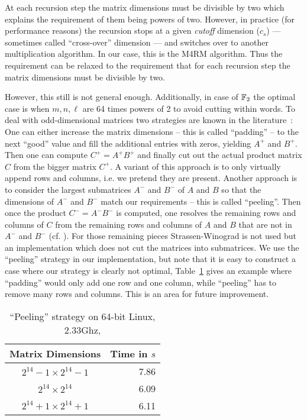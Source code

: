 At each recursion step the matrix dimensions must be divisible by two which explains the requirement of them being powers of two. However, in practice (for performance reasons) the recursion stops at a given \emph{cutoff} dimension ($c_s$) --- sometimes called ``cross-over'' dimension --- and switches over to another multiplication algorithm. In our case, this is the M4RM algorithm. Thus the requirement can be relaxed to the requirement that for each recursion step the matrix dimensions must be divisible by two.

However, this still is not general enough. Additionally, in case of $\mathbb{F}_2$ the optimal case is when $m,n,\ell$ are  64 times powers of 2 to avoid cutting within words. To deal with odd-dimensional matrices two strategies are known in the literature~\cite{strassen-implementation}: One can either increase the matrix dimensions -- this is called ``padding'' -- to the next ``good'' value and fill the additional entries with zeros, yielding $A^+$ and $B^+$. Then one can compute $C^+ = A^+B^+$ and finally cut out the actual product matrix $C$ from the bigger matrix $C^+$. A variant of this approach is to only virtually append rows and columns, i.e. we pretend they are present. Another approach is to consider the largest submatrices $A^-$ and $B^-$ of $A$ and $B$ so that the dimensions of $A^-$ and $B^-$ match our requirements -- this is called ``peeling''. Then once the product $C^- = A^-B^-$ is computed, one resolves the remaining rows and columns of $C$ from the remaining rows and columns of $A$ and $B$ that are not in $A^-$ and $B^-$ (cf. \cite{strassen-implementation}). For those remaining pieces Strassen-Winograd is not used but an implementation which does not cut the matrices into submatrices. We use the ``peeling'' strategy in our implementation, but note that it is easy to construct a case where our strategy is clearly not optimal, Table~\ref{tab:cutting} gives an example where ``padding'' would only add one row and one column, while ``peeling'' has to remove many rows and columns. This is an area for future improvement.

\begin{table}[htbp]
\begin{center}
\begin{tabular}{|c|r|}
\hline
Matrix Dimensions   & Time in $s$ \\
\hline
$2^{14}-1 \times 2^{14}-1$ & 7.86 \\
$2^{14} \times 2^{14}$ & 6.09 \\
$2^{14}+1 \times 2^{14}+1$ & 6.11 \\
\hline
\end{tabular}
\caption{``Peeling'' strategy on 64-bit Linux, 2.33Ghz, \CTD}
\label{tab:cutting}
\end{center}
\end{table}

